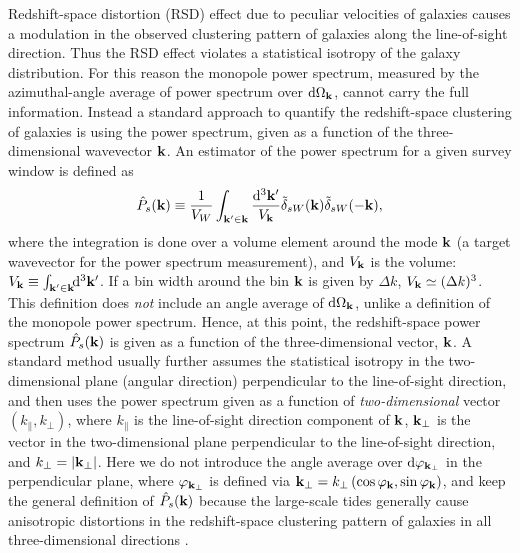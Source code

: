 \documentclass[prd,onecolumn,notitlepage,amsmath,amssymb,floatfix,superscriptaddress]{revtex4-1}
\newcommand{\bk}{{\bf k}}
\newcommand{\tdelta}{\tilde{\delta}}
\begin{document}
Redshift-space distortion (RSD) effect due to peculiar velocities of galaxies causes a modulation in the observed clustering pattern 
of galaxies along the line-of-sight direction. Thus the RSD effect violates a statistical isotropy of the galaxy distribution. 
For this reason the monopole power spectrum, measured by
the azimuthal-angle average of power spectrum over $\mathrm{d}\Omega_{\bk}$, 
cannot carry
the full information. Instead a standard approach to quantify the redshift-space clustering of galaxies
is using the power 
spectrum, given as a function of the three-dimensional wavevector $\bk$.
An estimator of the power spectrum for a given survey window is defined as
%
\begin{equation}
\hat{P}_s(\bk)\equiv \frac{1}{V_W}\int_{\bk'\in \bk}\frac{\mathrm{d}^3\bk'}{V_{\bk}}\tdelta_{sW}(\bk)\tdelta_{sW}(-\bk),
\label{eq:est_ps}
\end{equation}
%
where the integration is done over a volume element around the mode $\bk$ (a target wavevector 
for the power spectrum measurement), and $V_{\bk}$ is the volume: 
$V_{\bk}\equiv \int_{\bk'\in \bk}\!\!\mathrm{d}^3\bk'$. If a bin width around the bin $\bk$ is given by $\Delta k$, 
 $V_{\bk}\simeq (\Delta k)^3$. 
This definition does {\it not} include an angle average of $\mathrm{d}\Omega_{\bk}$, unlike a definition of the monopole
power spectrum. Hence, at this point, the redshift-space power spectrum $\hat{P}_s(\bk)$ is given as a function of the three-dimensional 
vector, $\bk$. A standard method usually further assumes the statistical isotropy in the two-dimensional plane (angular direction) perpendicular 
to the line-of-sight direction, and then uses the power spectrum given as a function of {\it two-dimensional} vector $(k_\parallel,k_\perp)$,  where 
$k_{\parallel}$ is the line-of-sight direction component of $\bk$,  $\bk_\perp$ is the vector in the two-dimensional plane perpendicular to the line-of-sight direction, and $k_\perp=|\bk_\perp|$.
Here we do not introduce the angle average over $\mathrm{d}\varphi_{\bk_\perp}$ in the perpendicular plane, 
where $\varphi_{\bk_\perp}$ is defined via 
$\bk_{\perp}=k_\perp\left(\cos\varphi_\bk,\sin\varphi_\bk\right)$, and keep the general definition of $\hat{P}_s(\bk)$ because 
the large-scale tides generally cause anisotropic distortions in the redshift-space clustering pattern of galaxies in all three-dimensional directions \citep[also see Ref.][for the similar discussion]{Shiraishietal:17}. 
\end{document}
